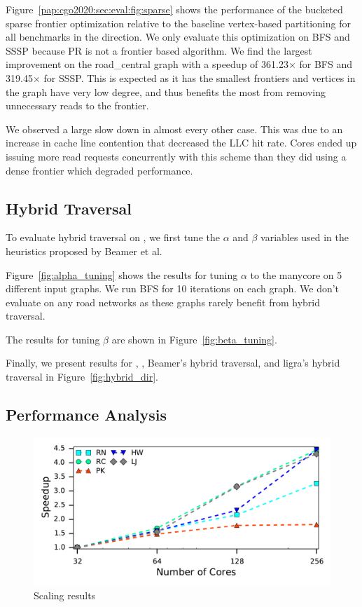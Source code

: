 Figure~\ref{pap:cgo2020:sec:eval:fig:sparse} shows the performance of the bucketed sparse frontier optimization relative to the baseline vertex-based partitioning for all benchmarks in the \push direction.
We only evaluate this optimization on BFS and SSSP because PR is not a frontier based algorithm.
We find the largest improvement on the road\_central graph with a speedup of 361.23$\times$ for BFS and 319.45$\times$ for SSSP.
This is expected as it has the smallest frontiers and vertices in the graph have very low degree, and thus benefits the most from removing unnecessary reads to the frontier.

We observed a large slow down in almost every other case.
This was due to an increase in cache line contention that decreased the LLC hit rate. 
Cores ended up issuing more read requests concurrently with this scheme than they did using a dense frontier which degraded performance.

\subsection{Hybrid Traversal}
\alphatune
\betatune
To evaluate hybrid traversal on \hb, we first tune the $\alpha$ and $\beta$ variables used in the heuristics proposed by Beamer et al.

Figure~\ref{fig:alpha_tuning} shows the results for tuning $\alpha$ to the \hb manycore on 5 different input graphs. 
We run BFS for 10 iterations on each graph.
We don't evaluate on any road networks as these graphs rarely benefit from hybrid traversal.

The results for tuning $\beta$ are shown in Figure~\ref{fig:beta_tuning}.

\hybridresults
Finally, we present results for \push, \pull, Beamer's hybrid traversal, and ligra's hybrid traversal in Figure~\ref{fig:hybrid_dir}.
 
\subsection{Performance Analysis}

\begin{figure}[h]
    \centering
    \includegraphics[scale = 0.6]{graphit-figures/hb-scaling-speedup.pdf}
    \caption{Scaling results } 
    \label{pap:generals:sec:eval:fig:scaling}
\end{figure}

